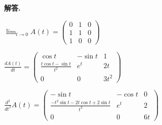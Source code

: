 \documentclass[12pt, a4paper, oneside]{ctexart}
\newcounter{problemname}
\newenvironment{solution}{\par\noindent\textbf{解答. }}{\par}
\newenvironment{note}{\par\noindent\textbf{题目\arabic{problemname}的注记. }}{\par}
\begin{document}
\begin{solution}
    
       $ \lim _{t \rightarrow 0} A(t)=\left(\begin{array}{lll}
        0 & 1 & 0 \\
        1 & 1 & 0 \\
        1 & 0 & 0
        \end{array}\right) $

        $
        \frac{d A(t)}{d t}=\left(\begin{array}{ccc}
        \cos t & -\sin t & 1 \\
        \frac{t \cos t-\sin t}{t^{2}} & e^{t} & 2 t \\
        0 & 0 & 3 t^{2}
        \end{array}\right) $
        
        $
        \frac{d^{2}}{d t^{2}} A(t)=\left(\begin{array}{ccc}
        -\sin t & -\cos t & 0 \\
        \frac{-t^{2} \sin t-2 t \cos t+2 \sin t}{t^{3}} & e^{t} & 2 \\
        0 & 0 & 6 t
        \end{array}\right)
       $

    
\end{solution}
\end{document}

